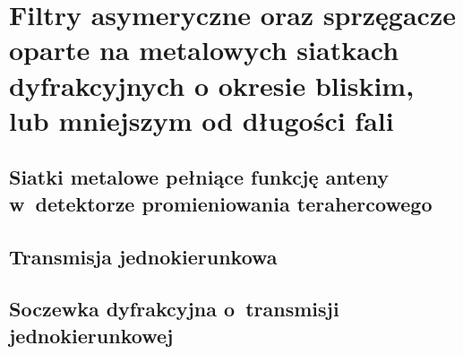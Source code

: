 \chapter{Filtry asymeryczne oraz {sprzęgacze} {oparte} na metalowych siatkach dyfrakcyjnych o okresie bliskim, lub mniejszym od długości fali}
\label{chap:thz}


\section{Siatki metalowe pełniące funkcję anteny w~detektorze promieniowania terahercowego}


\section{Transmisja jednokierunkowa}

\section{Soczewka dyfrakcyjna o~transmisji jednokierunkowej}


